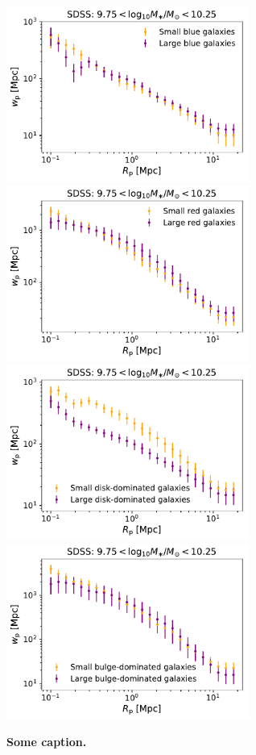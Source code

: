 \documentclass[usenatbib,usegraphicx,letterpaper]{mn2e}
\begin{document}
\begin{figure}
\centering
\includegraphics[width=8cm]{FIGS/blue_sdss_size_dependent_clustering_9p75_to_10p25.pdf}
\includegraphics[width=8cm]{FIGS/red_sdss_size_dependent_clustering_9p75_to_10p25.pdf}
\includegraphics[width=8cm]{FIGS/disk_sdss_size_dependent_clustering_9p75_to_10p25.pdf}
\includegraphics[width=8cm]{FIGS/bulge_sdss_size_dependent_clustering_9p75_to_10p25.pdf}
\caption{
{\bf Some caption.} 
}
\label{fig:strippingorphans}
\end{figure}
\end{document}

